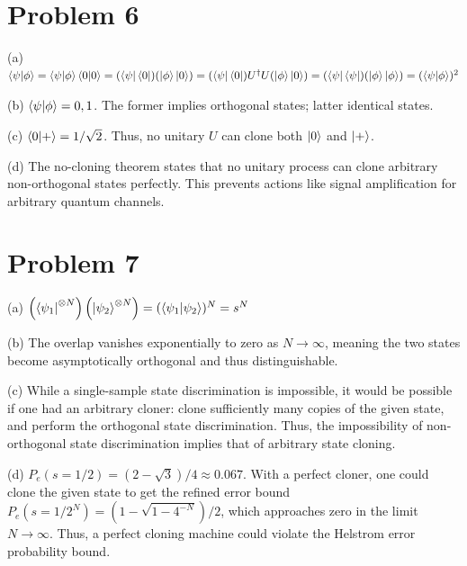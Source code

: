 \documentclass[11pt]{article}
\begin{document}
\section*{Problem 6}
\noindent
(a)
$
    \braket{\psi|\phi}
    = \braket{\psi|\phi}\braket{0|0}
    = (\bra{\psi}\bra{0}) (\ket{\phi}\ket{0})
    = (\bra{\psi}\bra{0}) U^\dagger U (\ket{\phi}\ket{0})
    = (\bra{\psi}\bra{\psi}) (\ket{\phi}\ket{\phi})
    = (\braket{\psi|\phi})^2
$

\noindent
(b) $\braket{\psi|\phi} = 0, 1$. The former implies orthogonal states; latter identical states.

\noindent
(c) $\braket{0|+}=1/\sqrt{2}$. Thus, no unitary $U$ can clone both $\ket{0}$ and $\ket{+}$.

\noindent
(d) The no-cloning theorem states that no unitary process can clone arbitrary non-orthogonal states perfectly.
This prevents actions like signal amplification for arbitrary quantum channels.

\section*{Problem 7}
\noindent
(a) $\left(\bra{\psi_1}^{\otimes N}\right) \left(\ket{\psi_2}^{\otimes N}\right)
= (\braket{\psi_1|\psi_2})^N = s^N$

\noindent
(b) The overlap vanishes exponentially to zero as $N\rightarrow\infty$,
meaning the two states become asymptotically orthogonal and thus distinguishable.

\noindent
(c) While a single-sample state discrimination is impossible,
it would be possible if one had an arbitrary cloner:
clone sufficiently many copies of the given state, and perform the orthogonal state discrimination.
Thus, the impossibility of non-orthogonal state discrimination implies that of arbitrary state cloning.

\noindent
(d) $P_e(s=1/2) = (2 - \sqrt{3})/4 \approx 0.067$.
With a perfect cloner, one could clone the given state to get the refined error bound
$P_e(s=1/2^N) = (1-\sqrt{1-4^{-N}})/2$, which approaches zero in the limit $N\rightarrow\infty$.
Thus, a perfect cloning machine could violate the Helstrom error probability bound.
\end{document}
